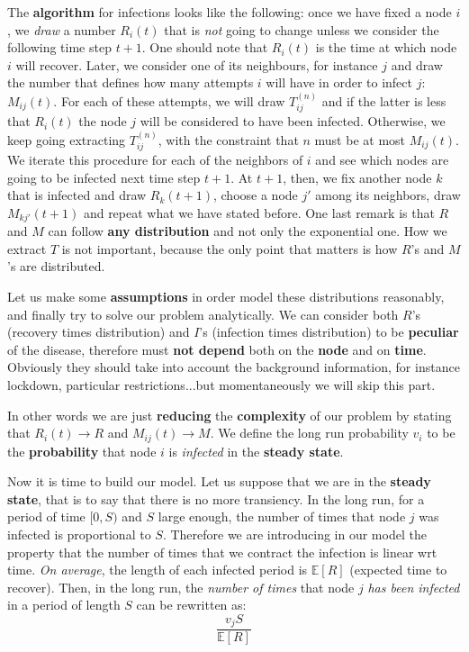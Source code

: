 \documentclass[../main/main.tex]{subfiles}
\begin{document}
The \textbf{algorithm} for infections looks like the following: once we have fixed a node $i$, we \textit{draw} a number $R_i(t)$ that is \textit{not} going to change unless we consider the following time step $t+1$. One should note that $R_i(t)$ is the time at which node $i$ will recover. Later, we consider one of its neighbours, for instance $j$ and draw the number that defines how many attempts $i$ will have in order to infect $j$: $M_{ij}(t)$. For each of these attempts, we will draw $T_{ij}^{(n)}$ and if the latter is less that $R_i(t)$ the node $j$ will be considered to have been infected. Otherwise, we keep going extracting  $T_{ij}^{(n)}$, with the constraint that $n$ must be at most $M_{ij}(t)$. We iterate this procedure for each of the neighbors of $i$ and see which nodes are going to be infected next time step $t+1$.
At $t+1$, then, we fix another node $k$ that is infected and draw $R_k(t+1)$, choose a node $j'$ among its neighbors, draw $M_{kj'}(t+1)$ and repeat what we have stated before.
One last remark is that \( R \) and \( M \) can follow \textbf{any distribution} and not only the exponential one. How we extract $T$ is not important, because the only point that matters is how $R$'s and $M$'s are distributed.

Let us make some \textbf{assumptions} in order model these distributions reasonably, and finally try to solve our problem analytically. We can consider both $R$'s (recovery times distribution) and $I$'s (infection times distribution) to be \textbf{peculiar} of the disease, therefore must \textbf{not depend} both on the \textbf{node} and on \textbf{time}. Obviously they should take into account the background information, for instance lockdown, particular restrictions...but momentaneously we will skip this part.

In other words we are just \textbf{reducing} the \textbf{complexity} of our problem by stating that \( R_i(t)  \to  R \) and \( M_{ij}(t) \to  M \). We define the long run probability \( v_i \) to be the \textbf{probability} that node \( i \) is \textit{infected} in the \textbf{steady state}.


Now it is time to build our model. Let us suppose that we are in the \textbf{steady state}, that is to say that there is no more transiency. In the long run, for a period of time $[0,S)$ and $S$ large enough, the number of times that node \( j \) was infected is proportional to \( S \). Therefore we are introducing in our model the property that the number of times that we contract the infection is linear wrt time.
\textit{On average}, the length of each infected period is $\mathbb{E}[R]$ (expected time to recover). Then, in the long run, the \textit{number of times} that node $j$ \textit{has been infected} in a period of length $S$ can be rewritten as:
\begin{equation*}
  \frac{v_j S}{\mathbb{E}[R]}
\end{equation*}
\end{document}
